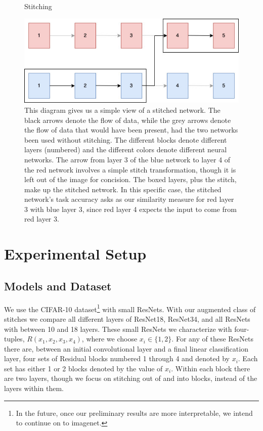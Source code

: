 \documentclass{article} %
\begin{document}
\label{Figure1}
\begin{center}
   \begin{figure}[h!]
      \centering
      \caption{Stitching}
      \includegraphics[width=12cm]{stitch.jpg}
      \caption*{This diagram gives us a simple view of a stitched network. The black arrows denote the flow of data, while
      the grey arrows denote the flow of data that would have been present, had the two networks been used without stitching.
      The different blocks denote different layers (numbered) and the different colors denote different neural networks. The arrow
      from layer 3 of the blue network to layer 4 of the red network involves a simple stitch transformation, though it is left
      out of the image for concision. The boxed layers, plus the stitch, make up the stitched network. In this specific case,
      the stitched network's task accuracy asks as our similarity measure for red layer 3 with 
      blue layer 3, since red layer 4 expects the input to come from red layer 3.}
   \end{figure}
\end{center}

\section{Experimental Setup}
\label{ExperimentalSetup}
\subsection*{Models and Dataset}
We use the CIFAR-10 dataset\footnote{In the future, once our preliminary results are more interpretable, we intend to
continue on to imagenet.} with small ResNets. With our augmented class of stitches we compare all different
layers of ResNet18, ResNet34, and all
ResNets with between 10 and 18 layers. These small ResNets we characterize with four-tuples,
$R(x_1, x_2, x_3, x_4)$, where we choose $x_i \in \{1, 2\}$. For any of these ResNets there are, between an initial convolutional
layer and a final linear classification layer, four sets of Residual blocks numbered 1 through 4 and denoted by
$x_i$. Each set has either 1 or 2 blocks denoted by the value of $x_i$. Within each block there are two layers,
though we focus on stitching out of and into blocks, instead of the layers within them. 
\end{document}
